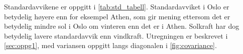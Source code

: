 \documentclass{article}
\begin{document}
\subsubsection{}
Standardavvikene er oppgitt i \autoref{tab:std_tabell}.
Standardavviket i Oslo er betydelig høyere enn for eksempel Athen, som gir mening ettersom det er betydelig mindre sol i Oslo om vinteren enn det er i Athen.
Solkraft har dog betydelig lavere standardavvik enn vindkraft. Utregningen er beskrevet i \autoref{sec:oppg1}, med variansen oppgitt langs diagonalen i \autoref{fig:covariance}.

\begin{table}[h]
\centering
{}
\qquad
{}
\caption{Standardavvik for kapasitetsfaktorer per lokasjon og teknologi.}
\label{tab:std_tabell}
\end{table}
\end{document}
